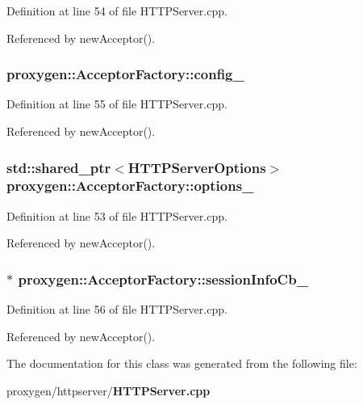 Definition at line 54 of file H\+T\+T\+P\+Server.\+cpp.



Referenced by new\+Acceptor().

\subsubsection[{config\+\_\+}]{ proxygen\+::\+Acceptor\+Factory\+::config\+\_\+\hspace{0.3cm}{\ttfamily [private]}}\label{classproxygen_1_1AcceptorFactory_a4c92f6b3e6817c4c6085aacffaee5be5}


Definition at line 55 of file H\+T\+T\+P\+Server.\+cpp.



Referenced by new\+Acceptor().

\subsubsection[{options\+\_\+}]{\setlength{\rightskip}{0pt plus 5cm}std\+::shared\+\_\+ptr$<${\bf H\+T\+T\+P\+Server\+Options}$>$ proxygen\+::\+Acceptor\+Factory\+::options\+\_\+\hspace{0.3cm}{\ttfamily [private]}}\label{classproxygen_1_1AcceptorFactory_ac855a330ec68de58aefa6115c54d0333}


Definition at line 53 of file H\+T\+T\+P\+Server.\+cpp.



Referenced by new\+Acceptor().

\subsubsection[{session\+Info\+Cb\+\_\+}]{$\ast$ proxygen\+::\+Acceptor\+Factory\+::session\+Info\+Cb\+\_\+\hspace{0.3cm}{\ttfamily [private]}}\label{classproxygen_1_1AcceptorFactory_a3949290eca84b57d147606a91fa1950f}


Definition at line 56 of file H\+T\+T\+P\+Server.\+cpp.



Referenced by new\+Acceptor().



The documentation for this class was generated from the following file\+:\begin{DoxyCompactItemize}
\item 
proxygen/httpserver/{\bf H\+T\+T\+P\+Server.\+cpp}\end{DoxyCompactItemize}
